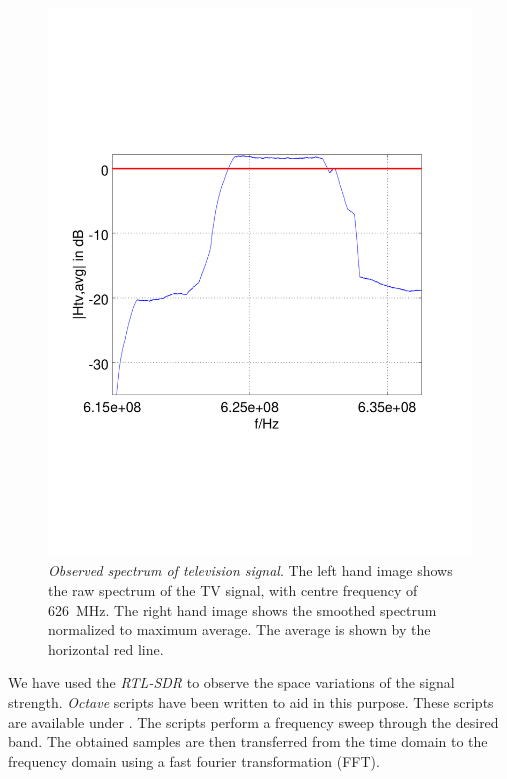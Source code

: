 \begin{figure}[h]
\begin{minipage}{0.49\columnwidth}
	\includegraphics[width=\columnwidth]{./fig/626mhz_filtered}
	\end{minipage}
	\vspace{-6mm}
	\caption{\emph{Observed spectrum of television signal}. The left hand image shows the raw spectrum of the TV signal, with centre frequency of \SI{626}{\mega\hertz}. The right hand image shows the smoothed spectrum normalized to maximum average. The average is  shown by the horizontal red line.}
	\label{fig:tv_record} 
		\vspace{-6mm}
\end{figure}

We have used the \textit{RTL-SDR} to observe the space variations of the
signal strength. \textit{Octave} scripts have been written to aid in
this purpose. These scripts are available under \cite{s3xm3x_RTLSDRSpecAn}. The scripts perform a
frequency sweep through the desired band. The obtained samples are then
transferred from the time domain to the frequency domain using a fast
fourier transformation (FFT). 

